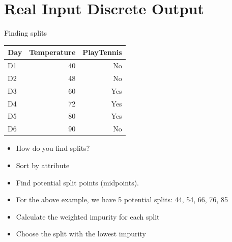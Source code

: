 \documentclass[usenames,dvipsnames]{beamer}
\begin{document}
\section{Real Input Discrete Output}


\begin{frame}{Finding splits}
\begin{table}[]
	\begin{tabular}{@{}lrr@{}}
		\toprule
		\textbf{Day} & \textbf{Temperature} & \textbf{PlayTennis} \\ \midrule
		D1           & 40                   & No                  \\
		D2           & 48                   & No                  \\
		D3           & 60                   & Yes                 \\
		D4           & 72                   & Yes                 \\
		D5           & 80                   & Yes                 \\
		D6           & 90                   & No                  \\ \bottomrule
	\end{tabular}
\end{table}
\begin{itemize}[<+->]
	\item How do you find splits?
	\item Sort by attribute
	\item Find potential split points (midpoints). 
	\item For the above example, we have 5 potential splits: 44, 54, 66, 76, 85
	\item Calculate the weighted impurity for each split
	\item Choose the split with the lowest impurity
\end{itemize}
\end{frame}
\end{document}
